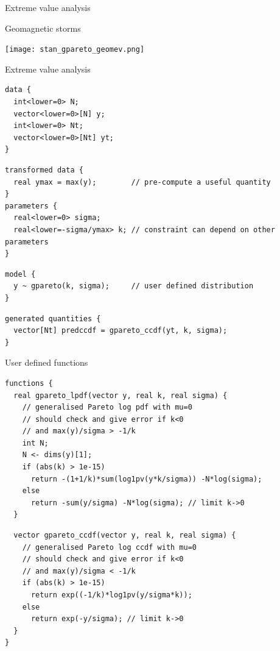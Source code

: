 \documentclass[finnish,english,t]{beamer}
\begin{document}
\begin{frame}{Extreme value analysis}

  \vspace{-0.5\baselineskip}
Geomagnetic storms

\texttt{[image: stan\_gpareto\_geomev.png]}  

\end{frame}

\begin{frame}[fragile]{Extreme value analysis}
  
  {\footnotesize
    {
  \begin{verbatim}
data {
  int<lower=0> N;
  vector<lower=0>[N] y;
  int<lower=0> Nt;
  vector<lower=0>[Nt] yt;
}
\end{verbatim}
    }
    \vspace{-1.5\baselineskip}
    {
\begin{verbatim}
transformed data {
  real ymax = max(y);        // pre-compute a useful quantity
}
parameters {
  real<lower=0> sigma; 
  real<lower=-sigma/ymax> k; // constraint can depend on other parameters
}
\end{verbatim}
    }
    \vspace{-1.5\baselineskip}
    {
\begin{verbatim}
model {
  y ~ gpareto(k, sigma);     // user defined distribution
}
\end{verbatim}
    }
    \vspace{-1.5\baselineskip}
    {
\begin{verbatim}
generated quantities {
  vector[Nt] predccdf = gpareto_ccdf(yt, k, sigma);
}
  \end{verbatim}
  }
}  
\end{frame} 

\begin{frame}[fragile]{User defined functions}
  
  \vspace{-.75\baselineskip}
  {\footnotesize
    {
  \begin{verbatim}
functions {
  real gpareto_lpdf(vector y, real k, real sigma) {
    // generalised Pareto log pdf with mu=0
    // should check and give error if k<0 
    // and max(y)/sigma > -1/k
    int N;
    N <- dims(y)[1];
    if (abs(k) > 1e-15)
      return -(1+1/k)*sum(log1pv(y*k/sigma)) -N*log(sigma);
    else
      return -sum(y/sigma) -N*log(sigma); // limit k->0
  }
\end{verbatim}
    }
    \vspace{-1.25\baselineskip}
    {
\begin{verbatim}
  vector gpareto_ccdf(vector y, real k, real sigma) {
    // generalised Pareto log ccdf with mu=0
    // should check and give error if k<0 
    // and max(y)/sigma < -1/k
    if (abs(k) > 1e-15)
      return exp((-1/k)*log1pv(y/sigma*k));
    else
      return exp(-y/sigma); // limit k->0
  }
}
  \end{verbatim}
    }
    }
\end{frame} 
\end{document}
